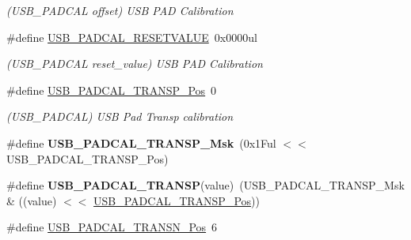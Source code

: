 \begin{DoxyCompactItemize}
\begin{DoxyCompactList}\small\item\em (U\+S\+B\+\_\+\+P\+A\+D\+C\+A\+L offset) U\+S\+B P\+A\+D Calibration \end{DoxyCompactList}\item 
\hypertarget{group___s_a_m_l21___u_s_b_ga6c7b2cef3d26f85db52daf52360cb8ec}{}\#define \hyperlink{group___s_a_m_l21___u_s_b_ga6c7b2cef3d26f85db52daf52360cb8ec}{U\+S\+B\+\_\+\+P\+A\+D\+C\+A\+L\+\_\+\+R\+E\+S\+E\+T\+V\+A\+L\+U\+E}~0x0000ul\label{group___s_a_m_l21___u_s_b_ga6c7b2cef3d26f85db52daf52360cb8ec}

\begin{DoxyCompactList}\small\item\em (U\+S\+B\+\_\+\+P\+A\+D\+C\+A\+L reset\+\_\+value) U\+S\+B P\+A\+D Calibration \end{DoxyCompactList}\item 
\hypertarget{group___s_a_m_l21___u_s_b_ga5354074947fba3a597f520f7ccb8479a}{}\#define \hyperlink{group___s_a_m_l21___u_s_b_ga5354074947fba3a597f520f7ccb8479a}{U\+S\+B\+\_\+\+P\+A\+D\+C\+A\+L\+\_\+\+T\+R\+A\+N\+S\+P\+\_\+\+Pos}~0\label{group___s_a_m_l21___u_s_b_ga5354074947fba3a597f520f7ccb8479a}

\begin{DoxyCompactList}\small\item\em (U\+S\+B\+\_\+\+P\+A\+D\+C\+A\+L) U\+S\+B Pad Transp calibration \end{DoxyCompactList}\item 
\hypertarget{group___s_a_m_l21___u_s_b_gab2a5ad41808ae3ca559ea36dad9eb33f}{}\#define {\bfseries U\+S\+B\+\_\+\+P\+A\+D\+C\+A\+L\+\_\+\+T\+R\+A\+N\+S\+P\+\_\+\+Msk}~(0x1\+Ful $<$$<$ U\+S\+B\+\_\+\+P\+A\+D\+C\+A\+L\+\_\+\+T\+R\+A\+N\+S\+P\+\_\+\+Pos)\label{group___s_a_m_l21___u_s_b_gab2a5ad41808ae3ca559ea36dad9eb33f}

\item 
\hypertarget{group___s_a_m_l21___u_s_b_ga0d18631481af17307cb82e2d59226af6}{}\#define {\bfseries U\+S\+B\+\_\+\+P\+A\+D\+C\+A\+L\+\_\+\+T\+R\+A\+N\+S\+P}(value)~(U\+S\+B\+\_\+\+P\+A\+D\+C\+A\+L\+\_\+\+T\+R\+A\+N\+S\+P\+\_\+\+Msk \& ((value) $<$$<$ \hyperlink{group___s_a_m_l21___u_s_b_ga5354074947fba3a597f520f7ccb8479a}{U\+S\+B\+\_\+\+P\+A\+D\+C\+A\+L\+\_\+\+T\+R\+A\+N\+S\+P\+\_\+\+Pos}))\label{group___s_a_m_l21___u_s_b_ga0d18631481af17307cb82e2d59226af6}

\item 
\hypertarget{group___s_a_m_l21___u_s_b_ga754c140a8bdd5eb6cff99bca755b8153}{}\#define \hyperlink{group___s_a_m_l21___u_s_b_ga754c140a8bdd5eb6cff99bca755b8153}{U\+S\+B\+\_\+\+P\+A\+D\+C\+A\+L\+\_\+\+T\+R\+A\+N\+S\+N\+\_\+\+Pos}~6\label{group___s_a_m_l21___u_s_b_ga754c140a8bdd5eb6cff99bca755b8153}


\end{DoxyCompactItemize}
